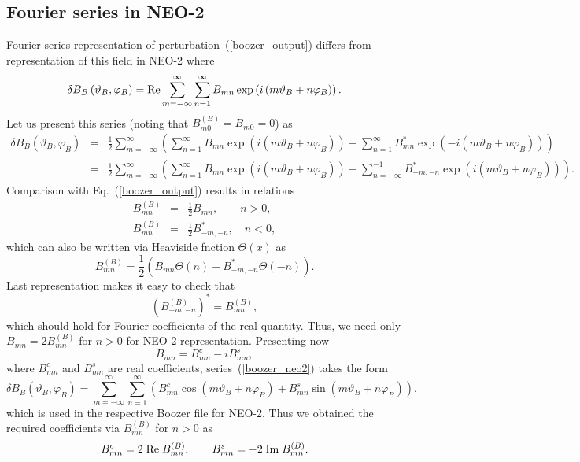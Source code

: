 \documentclass[12pt]{article}
\newcommand{\be}[1]{\begin{equation} \label{#1}}
\newcommand{\ee}{\end{equation}}
\newcommand{\bea}[1]{\begin{eqnarray} \label{#1}}
\newcommand{\eea}{\end{eqnarray}}
\newcommand{\eq}[1]{(\ref{#1})}
\begin{document}
\subsection{Fourier series in NEO-2}
\label{ssec:neo2-spectrum}

Fourier series representation of perturbation~\eq{boozer_output} differs from representation of this field in NEO-2 where
\be{boozer_neo2}
\delta B_B\left(\vartheta_B,\varphi_B\right) = {\rm Re}\sum \limits_{m=-\infty}^\infty\sum \limits_{n=1}^\infty
B_{mn}\exp\left(i\left(m\vartheta_B+n \varphi_B\right)\right).
\ee
Let us present this series (noting that $B_{m0}^{(B)}=B_{m0}=0$) as
\bea{transeries}
\delta B_B\left(\vartheta_B,\varphi_B\right) 
&=& 
\frac{1}{2}\sum \limits_{m=-\infty}^\infty
\left(
\sum \limits_{n=1}^\infty B_{mn}\exp\left(i\left(m\vartheta_B+n \varphi_B\right)\right)
+
\sum \limits_{n=1}^\infty B_{mn}^\ast\exp\left(-i\left(m\vartheta_B+n \varphi_B\right)\right)
\right)
 \\
&=& 
\frac{1}{2}\sum \limits_{m=-\infty}^\infty
\left(
\sum \limits_{n=1}^\infty B_{mn}\exp\left(i\left(m\vartheta_B+n \varphi_B\right)\right)
+
\sum \limits_{n=-\infty}^{-1} B_{-m,-n}^\ast\exp\left(i\left(m\vartheta_B+n \varphi_B\right)\right)
\right).
\nonumber
\eea
Comparison with Eq.~\eq{boozer_output} results in relations
\bea{rel_B_neo2}
B_{mn}^{(B)} &=& \frac{1}{2}B_{mn}, \qquad n > 0,
\nonumber \\
B_{mn}^{(B)} &=& \frac{1}{2}B_{-m,-n}^\ast, \quad n < 0,
\eea
which can also be written via Heaviside fnction $\Theta(x)$ as
$$
B_{mn}^{(B)} = \frac{1}{2}\left(B_{mn}\Theta(n)+B_{-m,-n}^\ast\Theta(-n)\right).
$$
Last representation makes it easy to check that
$$
\left(B^{(B)}_{-m,-n}\right)^\ast = B_{mn}^{(B)},
$$
which should hold for Fourier coefficients of the real quantity. Thus, we need only $B_{mn}=2B_{mn}^{(B)}$ for $n>0$
for NEO-2 representation. Presenting now
\be{cossin}
B_{mn}=B_{mn}^{c}- i B_{mn}^{s},
\ee
where $B_{mn}^{c}$ and $B_{mn}^{s}$ are real coefficients,
series~\eq{boozer_neo2} takes the form
\be{boozer_neo2_cossin}
\delta B_B\left(\vartheta_B,\varphi_B\right) = \sum \limits_{m=-\infty}^\infty\sum \limits_{n=1}^\infty
\left(
B_{mn}^c\cos\left(m\vartheta_B+n \varphi_B\right)
+
B_{mn}^s\sin\left(m\vartheta_B+n \varphi_B\right)
\right),
\ee
which is used in the respective Boozer file for NEO-2.
Thus we obtained the required coefficients via $B_{mn}^{(B)}$ for $n>0$ as
\be{reqcoef}
B_{mn}^c = 2\; {\rm Re}\; B_{mn}^{(B)},
\qquad
B_{mn}^s = - 2\; {\rm Im}\; B_{mn}^{(B)}.
\ee
\end{document}
